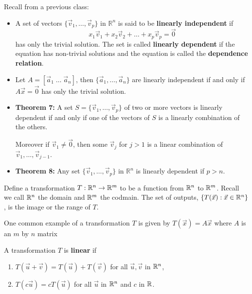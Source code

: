\documentclass[12pt,letterpaper]{article}
\begin{document}
\thispagestyle{fancy}

Recall from a previous class:

\begin{itemize}

\item A set of vectors $\{ \vec{v}_1, \dots, \vec{v}_p\}$ in $\mathbb{R}^n$ is said to be {\bf linearly independent} if $$x_1 \vec{v}_1 +x_2 \vec{v}_2 +\dots +x_p \vec{v}_p = \vec{0}$$ has only the trivial solution. The set is called {\bf linearly dependent} if the equation has non-trivial solutions and the equation is called the {\bf dependence relation}.
\item Let $A= [\vec{a}_1 \; \dots \; \vec{a}_n ]$, then $\{ \vec{a}_1 ,  \dots , \vec{a}_n \}$ are linearly independent if and only if $A \vec{x} = \vec{0}$ has only the trivial solution.
\item {\bf Theorem 7:} A set $S=\{ \vec{v}_1, \dots, \vec{v}_p \}$ of two or more vectors is linearly dependent if and only if one of the vectors of $S$ is a linearly combination of the others.

Moreover if $\vec{v}_1\neq \vec{0}$, then some $\vec{v}_j$ for $j>1$ is a linear combination of $\vec{v}_1, \dots, \vec{v}_{j-1}$.
\item {\bf Theorem 8:} Any set $\{ \vec{v}_1, \dots, \vec{v}_p \}$ in $\mathbb{R}^n$ is linearly dependent if $p>n$.
\end{itemize}

\newpage

Define a transformation $T : \mathbb{R}^n \to \mathbb{R}^m$ to be a function from $\mathbb{R}^n$ to $\mathbb{R}^m$.   Recall we call $\mathbb{R}^n$ the domain and $\mathbb{R}^m$ the codmain. The set of outputs, $\{T(\vec{x}):\vec{x}\in \mathbb{R}^n\}$, is the image or the range of $T$.

One common example of a transformation $T$ is given by $T(\vec{x})=A\vec{x}$ where $A$ is an $m$ by $n$ matrix

\begin{defn}
A transformation $T$ is {\bf linear} if 
\begin{enumerate}
	\item $T(\vec{u}+\vec{v})=T(\vec{u})+T(\vec{v})$ for all $\vec{u},\vec{v}$ in $\mathbb{R}^n$,
	\item $T(c\vec{u})=cT(\vec{u})$ for all $\vec{u}$ in $\mathbb{R}^n$ and $c$ in $\mathbb{R}$.
\end{enumerate}
\end{defn}
\end{document}
